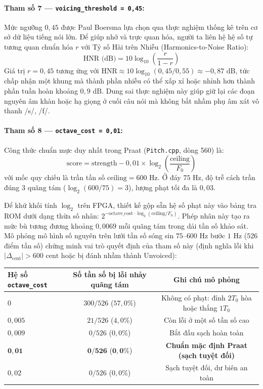 \documentclass[11pt,a4paper]{article}
\begin{document}
\paragraph{Tham số 7 --- \texttt{voicing\_threshold = 0,45}:}
Mức ngưỡng $0{,}45$ được Paul Boersma lựa chọn qua thực nghiệm thống kê trên cơ sở dữ liệu tiếng nói lớn. Để giúp nhớ và trực quan hóa, người ta liên hệ hệ số tự tương quan chuẩn hóa $r$ với Tỷ số Hài trên Nhiễu (Harmonics-to-Noise Ratio):
\begin{equation}
\text{HNR (dB)} = 10 \log_{10}\!\left(\frac{r}{1-r}\right)
\end{equation}
Giá trị $r = 0{,}45$ tương ứng với $\text{HNR} \approx 10 \log_{10}(0{,}45 / 0{,}55) \approx -0{,}87\text{ dB}$, tức chấp nhận một khung mà thành phần nhiễu có thể xấp xỉ hoặc nhỉnh hơn thành phần tuần hoàn khoảng $0{,}9\text{ dB}$. Dung sai thực nghiệm này giúp giữ lại các đoạn nguyên âm khàn hoặc hạ giọng ở cuối câu nói mà không bắt nhầm phụ âm xát vô thanh /s/, /f/.

\paragraph{Tham số 8 --- \texttt{octave\_cost = 0,01}:}
Công thức chuẩn mực duy nhất trong Praat (\texttt{Pitch.cpp}, dòng 560) là:
\begin{equation}
\text{score} = \text{strength} - 0{,}01 \times \log_2\left(\frac{\text{ceiling}}{F_0}\right)
\end{equation}
với mốc quy chiếu là trần tần số $\text{ceiling} = 600\text{ Hz}$. Ở đáy $75\text{ Hz}$, độ trễ cách trần đúng $3$ quãng tám ($\log_2(600/75) = 3$), lượng phạt tối đa là $0{,}03$.

Để khử khối tính $\log_2$ trên FPGA, thiết kế gộp sẵn hệ số phạt này vào bảng tra ROM dưới dạng thừa số nhân: $2^{-\text{octave\_cost} \cdot \log_2(\text{ceiling}/F_0)}$. Phép nhân này tạo ra mức bù tương đương khoảng $0{,}0069$ mỗi quãng tám trong dải tần số khảo sát.
Mô phỏng mô hình số nguyên trên lưới tần số sóng sin $75\text{--}600\text{ Hz}$ bước $1\text{ Hz}$ ($526$ điểm tần số) chứng minh vai trò quyết định của tham số này (định nghĩa lỗi khi $|\Delta_{\text{cent}}| > 600\text{ cent}$ hoặc bị đánh nhầm thành Unvoiced):

\begin{center}
\small
\begin{tabular}{@{}lcc@{}}
\toprule
Hệ số \texttt{octave\_cost} & Số tần số bị lỗi nhảy quãng tám & Ghi chú mô phỏng \\ \midrule
$0$ & $300 / 526$ ($57{,}0\%$) & Không có phạt: đỉnh $2T_0$ hòa hoặc thắng $1T_0$ \\
$0{,}005$ & $21 / 526$ ($4{,}0\%$) & Còn lỗi ở một số tần số cao \\
$0{,}009$ & $0 / 526$ ($0{,}0\%$) & Bắt đầu sạch hoàn toàn \\
$\mathbf{0{,}01}$ & $\mathbf{0 / 526}$ ($\mathbf{0{,}0\%}$) & \textbf{Chuẩn mặc định Praat (sạch tuyệt đối)} \\
$0{,}02$ & $0 / 526$ ($0{,}0\%$) & Sạch tuyệt đối, dư biên an toàn \\ \bottomrule
\end{tabular}
\end{center}
\end{document}
